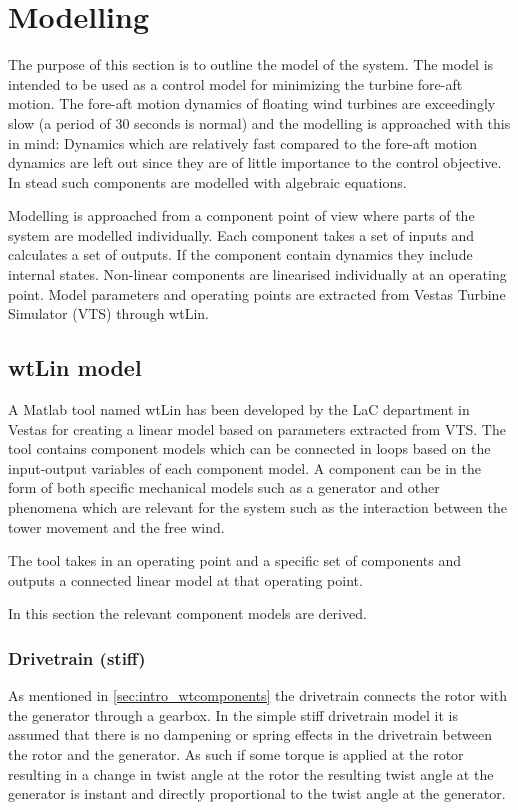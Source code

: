 \section{Modelling} \label{sec:mod} %
The purpose of this section is to outline the model of the system. The model is intended to be used as a control model for minimizing the turbine fore-aft motion. The fore-aft motion dynamics of floating wind turbines are exceedingly slow (a period of 30 seconds is normal) and the modelling is approached with this in mind: Dynamics which are relatively fast compared to the fore-aft motion dynamics are left out since they are of little importance to the control objective. In stead such components are modelled with algebraic equations. 

Modelling is approached from a component point of view where parts of the system are modelled individually. Each component takes a set of inputs and calculates a set of outputs. If the component contain dynamics they include internal states. Non-linear components are linearised individually at an operating point. Model parameters and operating points are extracted from Vestas Turbine Simulator (VTS) through wtLin.


\subsection{wtLin model}
A Matlab tool named wtLin has been developed by the LaC department in Vestas for creating a linear model based on parameters extracted from VTS. The tool contains component models which can be connected in loops based on the input-output variables of each component model. A component can be in the form of both specific mechanical models such as a generator and other phenomena which are relevant for the system such as the interaction between the tower movement and the free wind.

The tool takes in an operating point and a specific set of components and outputs a connected linear model at that operating point.

In this section the relevant component models are derived.


\subsubsection{Drivetrain (stiff)}
As mentioned in \cref{sec:intro_wtcomponents} the drivetrain connects the rotor with the generator through a gearbox. In the simple stiff drivetrain model it is assumed that there is no dampening or spring effects in the drivetrain between the rotor and the generator. As such if some torque is applied at the rotor resulting in a change in twist angle at the rotor the resulting twist angle at the generator is instant and directly proportional to the twist angle at the generator.

